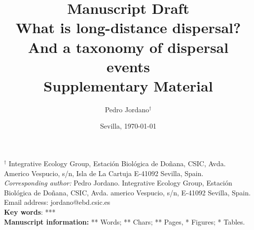 \documentclass[a4paper, 12pt]{article}
\begin{document}
\title{Manuscript Draft\\
\vspace{2cm}
What is long-distance dispersal? And a taxonomy of dispersal events \\
\textbf{Supplementary Material}}

\author{Pedro Jordano$^{\dag}$}

\date{Sevilla, \today}
\maketitle


\begin{spacing}{1.0}
$^{\dag}$ {\small Integrative Ecology Group, Estaci\'on Biol\'ogica de 
Do\~nana, CSIC, Avda. Americo Vespucio, s/n, Isla de La Cartuja
E-41092 Sevilla, Spain.}\\


{\small \textit{Corresponding author:} Pedro Jordano. Integrative Ecology Group, Estaci\'on Biol\'ogica de Do\~nana, CSIC, Avda. americo Vespucio, s/n, E-41092 Sevilla, Spain. Email address: jordano@ebd.csic.es}\\

\textbf{Key words}: ***\\

{\small \textbf{Manuscript information: }** Words; ** Chars; ** Pages, * Figures; * Tables.}
\end{spacing}

\maketitle
\newpage
\end{document}
